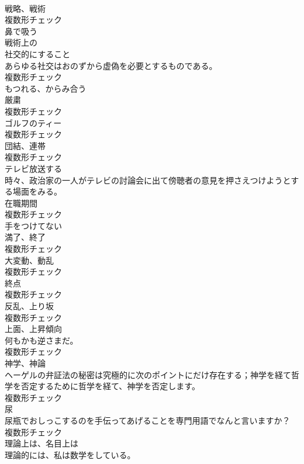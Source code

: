 \documentclass[8pt]{extreport}
\begin{document}
\begin{CJK}{UTF8}{min}
\\	[名詞]	戦略、戦術	
\\	複数形チェック
\\	[動詞]	鼻で吸う	
\\	[形容詞]	戦術上の	
\\	[名詞]	社交的にすること	
\\	あらゆる社交はおのずから虚偽を必要とするものである。	
\\	複数形チェック
\\	[動詞]	もつれる、からみ合う	
\\	[名詞]	厳粛	
\\	複数形チェック
\\	[名詞]	ゴルフのティー	
\\	複数形チェック
\\	[名詞]	団結、連帯	
\\	複数形チェック
\\	[動詞]	テレビ放送する	
\\	時々、政治家の一人がテレビの討論会に出て傍聴者の意見を押さえつけようとする場面をみる。	
\\	[名詞]	在職期間	
\\	複数形チェック
\\	[形容詞]	手をつけてない	
\\	[名詞]	満了、終了	
\\	複数形チェック
\\	[名詞]	大変動、動乱	
\\	複数形チェック
\\	[名詞]	終点	
\\	複数形チェック
\\	[名詞]	反乱、上り坂	
\\	複数形チェック
\\	[名詞]	上面、上昇傾向	
\\	何もかも逆さまだ。	
\\	複数形チェック
\\	[名詞]	神学、神論	
\\	ヘーゲルの弁証法の秘密は究極的に次のポイントにだけ存在する；神学を経て哲学を否定するために哲学を経て、神学を否定します。	
\\	複数形チェック
\\	[名詞]	尿	
\\	尿瓶でおしっこするのを手伝ってあげることを専門用語でなんと言いますか？	
\\	複数形チェック
\\	[副詞]	理論上は、名目上は	
\\	理論的には、私は数学をしている。	

\end{CJK}
\end{document}
